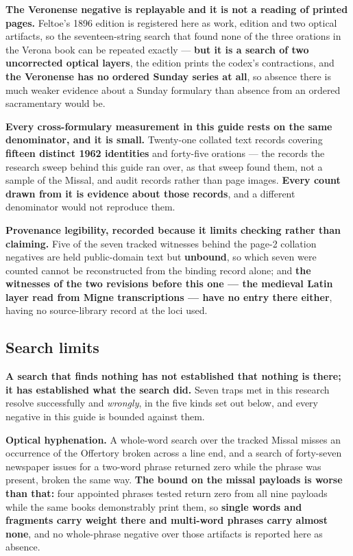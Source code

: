 \textbf{The Veronense negative is replayable and it is not a reading of printed
pages.} Feltoe's 1896 edition is registered here as work, edition and two
optical artifacts, so the seventeen-string search that found none of the three
orations in the Verona book can be repeated exactly --- \textbf{but it is a
search of two uncorrected optical layers}, the edition prints the codex's
contractions, and \textbf{the Veronense has no ordered Sunday series at all}, so
absence there is much weaker evidence about a Sunday formulary than absence from
an ordered sacramentary would be.

\textbf{Every cross-formulary measurement in this guide rests on the same
denominator, and it is small.} Twenty-one collated text records covering
\textbf{fifteen distinct 1962 identities} and forty-five orations --- the
records the research sweep behind this guide ran over, as that sweep found them,
not a sample of the Missal, and audit records rather than page images.
\textbf{Every count drawn from it is evidence about those records}, and a
different denominator would not reproduce them.

\textbf{Provenance legibility, recorded because it limits checking rather than
claiming.} Five of the seven tracked witnesses behind the page-2 collation
negatives are held public-domain text but \textbf{unbound}, so which seven were
counted cannot be reconstructed from the binding record alone; and \textbf{the
witnesses of the two revisions before this one --- the medieval Latin layer read
from Migne transcriptions --- have no entry there either}, having no
source-library record at the loci used.

\subsection*{Search limits}

\textbf{A search that finds nothing has not established that nothing is there;
it has established what the search did.} Seven traps met in this research
resolve successfully and \emph{wrongly}, in the five kinds set out below, and
every negative in this guide is bounded against them.

\textbf{Optical hyphenation.} A whole-word search over the tracked Missal misses
an occurrence of the Offertory broken across a line end, and a search of
forty-seven newspaper issues for a two-word phrase returned zero while the
phrase was present, broken the same way. \textbf{The bound on the missal
payloads is worse than that:} four appointed phrases tested return zero from all
nine payloads while the same books demonstrably print them, so \textbf{single
words and fragments carry weight there and multi-word phrases carry almost
none}, and no whole-phrase negative over those artifacts is reported here as
absence.

